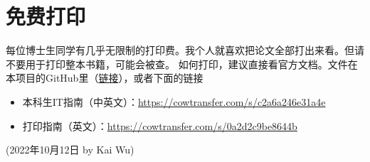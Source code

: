 \section{免费打印}
每位博士生同学有几乎无限制的打印费。我个人就喜欢把论文全部打出来看。但请不要用于打印整本书籍，可能会被查。
如何打印，建议直接看官方文档。文件在本项目的GitHub里（\href{https://github.com/kaiwu-astro/xp_pgrs_unofficial_guide/tree/main/fileshare}{链接}），或者下面的链接
\begin{itemize}
    \item 本科生IT指南（中英文）：\url{https://cowtransfer.com/s/c2a6a246e31a4e}
    \item 打印指南（英文）：\url{https://cowtransfer.com/s/0a2d2c9be8644b}
\end{itemize}


\begin{flushright}
(2022年10月12日 by Kai Wu)
\end{flushright}